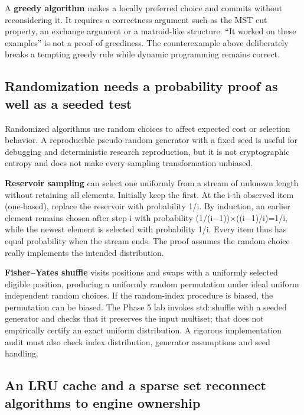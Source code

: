 A \textbf{greedy algorithm} makes a locally preferred choice and commits without reconsidering it. It requires a correctness argument such as the MST cut property, an exchange argument or a matroid-like structure. ``It worked on these examples'' is not a proof of greediness. The counterexample above deliberately breaks a tempting greedy rule while dynamic programming remains correct.

\subsection{Randomization needs a probability proof as well as a seeded test}\label{05-engine-i-ch008-randomization-needs-a-probability-proof-as-well-as-a-seeded-test}

\hypertarget{05-engine-i-ch008-randomization-needs-a-probability-proof-as-well-as-a-seeded-test}{}

Randomized algorithms use random choices to affect expected cost or selection behavior. A reproducible pseudo-random generator with a fixed seed is useful for debugging and deterministic research reproduction, but it is not cryptographic entropy and does not make every sampling transformation unbiased.

\textbf{Reservoir sampling} can select one uniformly from a stream of unknown length without retaining all elements. Initially keep the first. At the i-th observed item (one-based), replace the reservoir with probability 1/i. By induction, an earlier element remains chosen after step i with probability (1/(i−1))×((i−1)/i)=1/i, while the newest element is selected with probability 1/i. Every item thus has equal probability when the stream ends. The proof assumes the random choice really implements the intended distribution.

\textbf{Fisher--Yates shuffle} visits positions and swaps with a uniformly selected eligible position, producing a uniformly random permutation under ideal uniform independent random choices. If the random-index procedure is biased, the permutation can be biased. The Phase 5 lab invokes std::shuffle with a seeded generator and checks that it preserves the input multiset; that does not empirically certify an exact uniform distribution. A rigorous implementation audit must also check index distribution, generator assumptions and seed handling.

\subsection{An LRU cache and a sparse set reconnect algorithms to engine ownership}\label{05-engine-i-ch008-an-lru-cache-and-a-sparse-set-reconnect-algorithms-to-engine-ownership}

